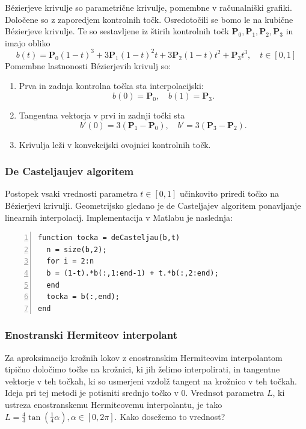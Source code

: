 \documentclass[a4paper,12pt]{article}
\begin{document}
	B\'{e}zierjeve krivulje so parametrične krivulje, pomembne v računalniški grafiki. Določene so z zaporedjem kontrolnih točk.
	Osredotočili se bomo le na kubične B\'{e}zierjeve krivulje. Te so sestavljene iz štirih kontrolnih točk $\boldsymbol{P}_0, \boldsymbol{P}_1, \boldsymbol{P}_2, \boldsymbol{P}_3$ in imajo obliko
	\begin{equation*}
		b(t) = \boldsymbol{P}_0(1-t)^3 + 3\boldsymbol{P}_1(1-t)^2t + 3\boldsymbol{P}_2(1-t)t^2 + \boldsymbol{P}_3t^3, \quad t \in [0,1]
	\end{equation*}
	Pomembne lastnonosti B\'{e}zierjevih krivulj so: 
	\begin{enumerate}[label=(\roman*)]
		\item Prva in zadnja kontrolna točka sta interpolacijski: 
		$$b(0) = \boldsymbol{P}_0,\quad b(1) = \boldsymbol{P}_3.$$
		\item Tangentna vektorja v prvi in zadnji točki sta
		$$b'(0) = 3(\boldsymbol{P}_1 - \boldsymbol{P}_0),\quad b' = 3(\boldsymbol{P}_3 - \boldsymbol{P}_2).$$
		\item Krivulja leži v konvekcijski ovojnici kontrolnih točk.

	\end{enumerate}
	
	\subsubsection{De Casteljaujev algoritem}
	
	Postopek vsaki vrednosti parametra $t \in [0,1]$ učinkovito priredi točko na B\'{e}zierjevi krivulji. Geometrijsko gledano je de Casteljajev algoritem ponavljanje linearnih interpolacij.
	Implementacija v Matlabu je naslednja:
	\begin{lstlisting}[style=Matlab-editor,numbers=left]
function tocka = deCasteljau(b,t)
  n = size(b,2);
  for i = 2:n
  b = (1-t).*b(:,1:end-1) + t.*b(:,2:end);   
  end
  tocka = b(:,end);
end
	\end{lstlisting}
	
	
	\subsubsection{Enostranski Hermiteov interpolant}
	
	Za aproksimacijo krožnih lokov z enostranskim Hermiteovim interpolantom tipično določimo točke na krožnici, ki jih želimo interpolirati, 
	in tangentne vektorje v teh točkah, ki so usmerjeni vzdolž tangent na krožnico v teh točkah. Ideja pri tej metodi je potisniti srednjo točko v $0$. 
	Vrednsot parametra $L$, ki ustreza enostranskemu Hermiteovemu interpolantu, je tako $L = \frac{4}{3} \tan(\frac{1}{4}\alpha), \alpha \in [0,2\pi]$.
	Kako dosežemo to vrednost? 
	
\end{document}
